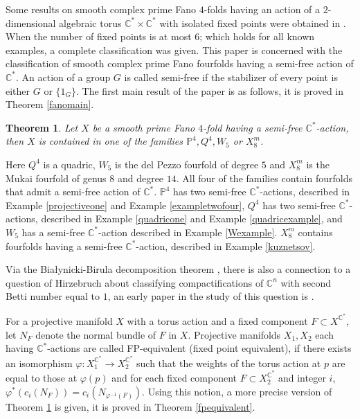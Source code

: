 \documentclass[12pt]{article}
\newtheorem{mainthm}{Theorem}
\begin{document}
Some results on smooth complex prime Fano $4$-folds having an action of a $2$-dimensional algebraic torus $\mathbb{C}^* \times \mathbb{C}^*$ with isolated fixed points were obtained in \cite{GLS}. When the number of fixed points is at most $6$; which holds for all known examples, a complete classification was given. This paper is concerned with the classification of smooth complex prime Fano fourfolds having a semi-free action of $\mathbb{C}^*$. An action of a group $G$ is called semi-free if the stabilizer of every point is either $G$ or $\{1_G\}$. The first main result of the paper is as follows, it is proved in Theorem \ref{fanomain}.

\begin{mainthm}  \label{thm:mainB} 
Let $X$ be a smooth prime Fano $4$-fold having a semi-free $\mathbb{C}^*$-action, then $X$ is contained in one of the families $\mathbb{P}^4,Q^4,W_5$ or $X^{m}_{8}$. 
\end{mainthm}
Here $Q^4$ is a quadric, $W_5$ is the del Pezzo fourfold of degree $5$ and $X^{m}_{8}$ is the Mukai fourfold of genus $8$ and degree $14$. All four of the families contain fourfolds that admit a semi-free action of $\mathbb{C}^*$. $\mathbb{P}^4$ has two semi-free $\mathbb{C}^*$-actions, described in Example \ref{projectiveone} and Example \ref{exampletwofour}, $Q^4$ has two semi-free $\mathbb{C}^*$-actions, described in Example \ref{quadricone} and Example \ref{quadricexample}, and $W_5$ has a semi-free $\mathbb{C}^*$-action described in Example \ref{Wexample}. $X^{m}_{8}$ contains fourfolds having a semi-free $\mathbb{C}^*$-action, described in Example \ref{kuznetsov}. 

Via the Białynicki-Birula decomposition theorem \cite{BB}, there is also a connection to a question of Hirzebruch \cite[Problem 27]{Hi} about classifying compactifications of $\mathbb{C}^n$ with second Betti number equal to $1$, an early paper in the study of this question is \cite{V}. 

 For a projective manifold $X$ with a torus action  and a fixed component $F \subset X^{\mathbb{C}^*}$, let $N_{F}$ denote the normal bundle of $F$ in $X$. Projective manifolds $X_{1},X_{2}$ each having $\mathbb{C}^*$-actions are called FP-equivalent (fixed point equivalent), if there exists an isomorphism $\varphi: X_{1}^{\mathbb{C}^*} \rightarrow X_{2}^{\mathbb{C}^*} $ such that the weights of the torus action at $p$ are equal to those at $\varphi(p)$ and for each fixed component $F \subset X_{2}^{\mathbb{C}^*}$ and integer $i$, $\varphi^{*}(c_{i}(N_{F})) = c_{i}(N_{\varphi^{-1}(F)})$.  Using this notion, a more precise version of Theorem \ref{thm:mainB} is given, it is proved in Theorem \ref{fpequivalent}.
\end{document}
